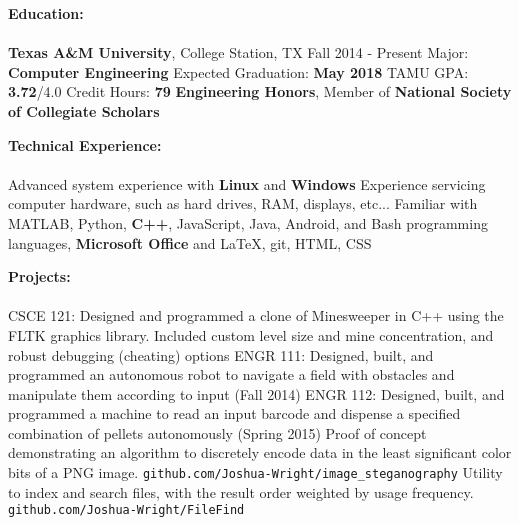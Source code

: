 \documentclass[12pt]{article}
\begin{document}
\begin{flushleft}
\begin{outline}[compactitem]

\newcommand{\upspace}{\vspace{0px}}
\newcommand{\zzz}[1]{\upspace \0 \textbf{#1} \\ \vspace{-0.8\baselineskip} \hrulefill \vspace{-2px} \\ }
\renewcommand\labelitemii{\labelitemi}
\let\oldOne\1\let\oldTwo\2\let\oldThree\3\let\oldFour\4
\renewcommand{\1}{\upspace \oldOne  }
\renewcommand{\2}{\upspace \oldTwo  }
\renewcommand{\3}{\upspace \oldThree}
\renewcommand{\4}{\upspace \oldFour }

\zzz{Education:}
  \1 \textbf{Texas A\&M University}, College Station, TX \hfill Fall 2014 - Present
    \2 Major: \textbf{Computer Engineering}
    \2 Expected Graduation: \textbf{May 2018}
    \2 TAMU GPA: \textbf{3.72}/4.0
    \2 Credit Hours: \textbf{79}
    \2 \textbf{Engineering Honors}, Member of \textbf{National Society of Collegiate Scholars}

\zzz{Technical Experience:}
  \1 Advanced system experience with \textbf{Linux} and \textbf{Windows}
  \1 Experience servicing computer hardware, such as hard drives, RAM, displays, etc...
  \1 Familiar with MATLAB, Python, \textbf{C++}, JavaScript, Java, Android, and Bash programming languages, 
  \textbf{Microsoft Office} and LaTeX, git, HTML, CSS

\zzz{Projects:}
  \1 CSCE 121: Designed and programmed a clone of Minesweeper in C++ using the FLTK graphics library. Included custom level size and mine concentration, and robust debugging (cheating) options
  \1 ENGR 111: Designed, built, and programmed an autonomous robot to navigate 
  a field with obstacles and manipulate them according to input (Fall 2014)
  \1 ENGR 112: Designed, built, and programmed a machine to read an input 
  barcode and dispense a specified combination of pellets autonomously (Spring 2015)
  \1 Proof of concept demonstrating an algorithm to discretely encode data in the least significant color bits of a PNG image.
    \verb|github.com/Joshua-Wright/image_steganography|
  \1 Utility to index and search files, with the result order weighted by usage frequency.
    \verb|github.com/Joshua-Wright/FileFind|


\end{outline}
\end{flushleft}
\end{document}
